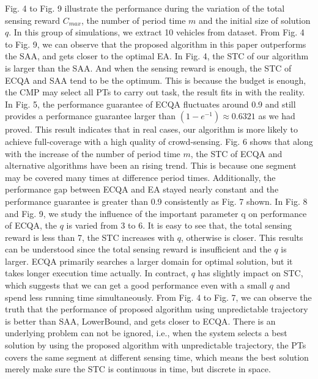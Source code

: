 \documentclass[journal]{IEEEtran}
\begin{document}
Fig. 4 to Fig. 9 illustrate the performance during the variation of the total sensing reward $C_{max}$, the number of period time $m$ and the initial size of solution $q$. In this group of simulations, we extract 10 vehicles from dataset. From Fig. 4 to Fig. 9, we can observe that the proposed algorithm in this paper outperforms the SAA, and gets closer to the optimal EA. In Fig. 4, the STC of our algorithm is larger than the SAA. And when the sensing reward is enough, the STC of ECQA and SAA tend to be the optimum. This is because the budget is enough, the CMP may select all PTs to carry out task, the result fits in with the reality. In Fig. 5, the performance guarantee of ECQA fluctuates around 0.9 and still provides a performance guarantee larger than $(1-e^{-1})\approx0.6321$ as we had proved. This result indicates that in real cases, our algorithm is more likely to achieve full-coverage with a high quality of crowd-sensing. Fig. 6 shows that along with the increase of the number of period time $m$, the STC of ECQA and alternative algorithms have been an rising trend. This is because one segment may be covered many times at difference period times. Additionally, the performance gap between ECQA and EA stayed nearly constant and the performance guarantee is greater than 0.9 consistently as Fig. 7 shown. In Fig. 8 and Fig. 9, we study the influence of the important parameter q on performance of ECQA, the $q$ is varied from 3 to 6. It is easy to see that, the total sensing reward is less than 7, the STC increases with $q$, otherwise is closer. This results can be understood since the total sensing reward is insufficient and the $q$ is larger. ECQA primarily searches a larger domain for optimal solution, but it takes longer execution time actually. In contract, $q$ has slightly impact on STC, which suggests that we can get a good performance even with a small $q$ and spend less running time simultaneously. From Fig. 4 to Fig. 7, we can observe the truth that the performance of proposed algorithm using unpredictable trajectory is better than SAA, LowerBound, and gets closer to ECQA. There is an underlying problem can not be ignored, i.e., when the system selects a best solution by using the proposed algorithm with unpredictable trajectory, the PTs covers the same segment at different sensing time, which means the best solution merely make sure the STC is continuous in time, but discrete in space.
\end{document}
